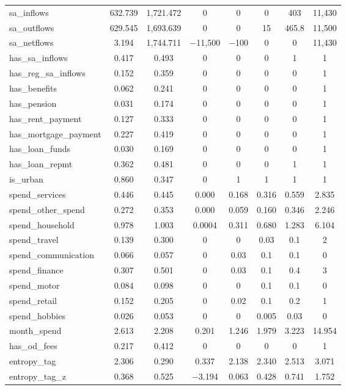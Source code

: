 \begin{table}[!htbp]
\begin{tabular}{@{\extracolsep{5pt}}lccccccc}
sa\_inflows & 632.739 & 1,721.472 & 0 & 0 & 0 & 403 & 11,430 \\ 
sa\_outflows & 629.545 & 1,693.639 & 0 & 0 & 15 & 465.8 & 11,500 \\ 
sa\_netflows & 3.194 & 1,744.711 & $-$11,500 & $-$100 & 0 & 0 & 11,430 \\ 
has\_sa\_inflows & 0.417 & 0.493 & 0 & 0 & 0 & 1 & 1 \\ 
has\_reg\_sa\_inflows & 0.152 & 0.359 & 0 & 0 & 0 & 0 & 1 \\ 
has\_benefits & 0.062 & 0.241 & 0 & 0 & 0 & 0 & 1 \\ 
has\_pension & 0.031 & 0.174 & 0 & 0 & 0 & 0 & 1 \\ 
has\_rent\_payment & 0.127 & 0.333 & 0 & 0 & 0 & 0 & 1 \\ 
has\_mortgage\_payment & 0.227 & 0.419 & 0 & 0 & 0 & 0 & 1 \\ 
has\_loan\_funds & 0.030 & 0.169 & 0 & 0 & 0 & 0 & 1 \\ 
has\_loan\_repmt & 0.362 & 0.481 & 0 & 0 & 0 & 1 & 1 \\ 
is\_urban & 0.860 & 0.347 & 0 & 1 & 1 & 1 & 1 \\ 
spend\_services & 0.446 & 0.445 & 0.000 & 0.168 & 0.316 & 0.559 & 2.835 \\ 
spend\_other\_spend & 0.272 & 0.353 & 0.000 & 0.059 & 0.160 & 0.346 & 2.246 \\ 
spend\_household & 0.978 & 1.003 & 0.0004 & 0.311 & 0.680 & 1.283 & 6.104 \\ 
spend\_travel & 0.139 & 0.300 & 0 & 0 & 0.03 & 0.1 & 2 \\ 
spend\_communication & 0.066 & 0.057 & 0 & 0.03 & 0.1 & 0.1 & 0 \\ 
spend\_finance & 0.307 & 0.501 & 0 & 0.03 & 0.1 & 0.4 & 3 \\ 
spend\_motor & 0.084 & 0.098 & 0 & 0 & 0.1 & 0.1 & 0 \\ 
spend\_retail & 0.152 & 0.205 & 0 & 0.02 & 0.1 & 0.2 & 1 \\ 
spend\_hobbies & 0.026 & 0.053 & 0 & 0 & 0.005 & 0.03 & 0 \\ 
month\_spend & 2.613 & 2.208 & 0.201 & 1.246 & 1.979 & 3.223 & 14.954 \\ 
has\_od\_fees & 0.217 & 0.412 & 0 & 0 & 0 & 0 & 1 \\ 
entropy\_tag & 2.306 & 0.290 & 0.337 & 2.138 & 2.340 & 2.513 & 3.071 \\ 
entropy\_tag\_z & 0.368 & 0.525 & $-$3.194 & 0.063 & 0.428 & 0.741 & 1.752 \\ 

\end{tabular}
\end{table}
